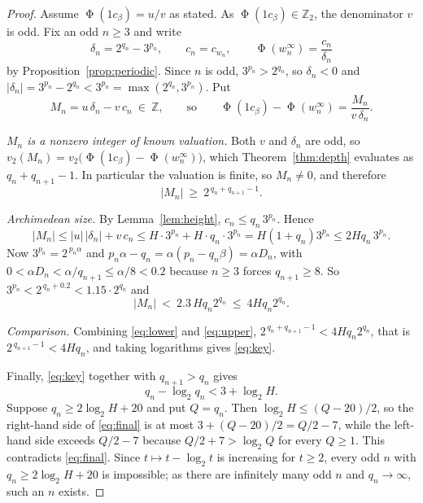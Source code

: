 \documentclass[11pt,reqno]{amsart}
\theoremstyle{plain}
\theoremstyle{definition}
\newcommand{\Zt}{\mathbb{Z}_2}
\newcommand{\Z}{\mathbb{Z}}
\newcommand{\vt}{v_2}
\DeclareMathOperator{\Ph}{\Phi}
\begin{document}
\begin{proof}
Assume $\Ph(1c_\beta)=u/v$ as stated. As $\Ph(1c_\beta)\in\Zt$, the denominator
$v$ is odd. Fix an odd $n\ge3$ and write
\[
\delta_n=2^{q_n}-3^{p_n},\qquad c_n=c_{w_n},\qquad
\Ph(w_n^\infty)=\frac{c_n}{\delta_n}
\]
by Proposition~\ref{prop:periodic}. Since $n$ is odd, $3^{p_n}>2^{q_n}$, so
$\delta_n<0$ and $|\delta_n|=3^{p_n}-2^{q_n}<3^{p_n}=\max(2^{q_n},3^{p_n})$. Put
\[
M_n=u\,\delta_n-v\,c_n\ \in\ \Z,\qquad\text{so}\qquad
\Ph(1c_\beta)-\Ph(w_n^\infty)=\frac{M_n}{v\,\delta_n}.
\]

\emph{$M_n$ is a nonzero integer of known valuation.} Both $v$ and $\delta_n$ are
odd, so $\vt(M_n)=\vt\bigl(\Ph(1c_\beta)-\Ph(w_n^\infty)\bigr)$, which
Theorem~\ref{thm:depth} evaluates as $q_n+q_{n+1}-1$. In particular the valuation
is finite, so $M_n\ne0$, and therefore
\begin{equation}\label{eq:lower}
|M_n|\ \ge\ 2^{\,q_n+q_{n+1}-1}.
\end{equation}

\emph{Archimedean size.} By Lemma~\ref{lem:height}, $c_n\le q_n\,3^{p_n}$. Hence
\[
|M_n|\le |u|\,|\delta_n|+v\,c_n
\le H\cdot 3^{p_n}+H\cdot q_n\cdot 3^{p_n}
=H(1+q_n)3^{p_n}\le 2Hq_n\,3^{p_n}.
\]
Now $3^{p_n}=2^{\,p_n\alpha}$ and $p_n\alpha-q_n=\alpha(p_n-q_n\beta)=\alpha D_n$,
with $0<\alpha D_n<\alpha/q_{n+1}\le\alpha/8<0.2$ because $n\ge3$ forces
$q_{n+1}\ge8$. So $3^{p_n}<2^{\,q_n+0.2}<1.15\cdot 2^{q_n}$ and
\begin{equation}\label{eq:upper}
|M_n|\ <\ 2.3\,H q_n 2^{q_n}\ \le\ 4Hq_n2^{q_n}.
\end{equation}

\emph{Comparison.} Combining \eqref{eq:lower} and \eqref{eq:upper},
$2^{\,q_n+q_{n+1}-1}<4Hq_n2^{q_n}$, that is $2^{\,q_{n+1}-1}<4Hq_n$, and taking
logarithms gives \eqref{eq:key}.

Finally, \eqref{eq:key} together with $q_{n+1}>q_n$ gives
\begin{equation}\label{eq:final}
q_n-\log_2q_n<3+\log_2H .
\end{equation}
Suppose $q_n\ge 2\log_2H+20$ and put $Q=q_n$. Then $\log_2H\le (Q-20)/2$, so the
right-hand side of \eqref{eq:final} is at most $3+(Q-20)/2=Q/2-7$, while the
left-hand side exceeds $Q/2-7$ because $Q/2+7>\log_2Q$ for every $Q\ge1$. This
contradicts \eqref{eq:final}. Since $t\mapsto t-\log_2t$ is increasing for
$t\ge2$, every odd $n$ with $q_n\ge 2\log_2H+20$ is impossible; as there are
infinitely many odd $n$ and $q_n\to\infty$, such an $n$ exists.
\end{proof}
\end{document}
